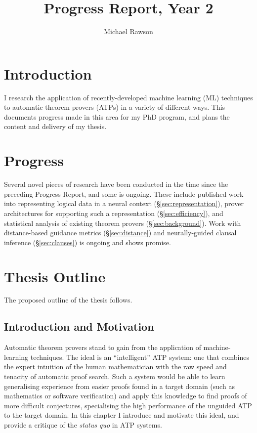 \documentclass[a4paper]{article}
\title{Progress Report, Year 2}
\author{Michael Rawson}
\begin{document}
\maketitle
\section{Introduction}
I research the application of recently-developed machine learning (ML) techniques to automatic theorem provers (ATPs) in a variety of different ways.
This documents progress made in this area for my PhD program, and plans the content and delivery of my thesis.

\section{Progress}
Several novel pieces of research have been conducted in the time since the preceding Progress Report, and some is ongoing.
These include published work into representing logical data in a neural context (\S\ref{sec:representation}), prover architectures for supporting such a representation (\S\ref{sec:efficiency}), and statistical analysis of existing theorem provers (\S\ref{sec:background}).
Work with distance-based guidance metrics (\S\ref{sec:distance}) and neurally-guided clausal inference (\S\ref{sec:clauses}) is ongoing and shows promise.

\section{Thesis Outline}
The proposed outline of the thesis follows.

\subsection{Introduction and Motivation}
\label{sec:introduction}
Automatic theorem provers stand to gain from the application of machine-learning techniques.
The ideal is an ``intelligent'' ATP system: one that combines the expert intuition of the human mathematician with the raw speed and tenacity of automatic proof search.
Such a system would be able to learn generalising experience from easier proofs found in a target domain (such as mathematics or software verification) and apply this knowledge to find proofs of more difficult conjectures, specialising the high performance of the unguided ATP to the target domain.
In this chapter I introduce and motivate this ideal, and provide a critique of the \emph{status quo} in ATP systems.
\end{document}
